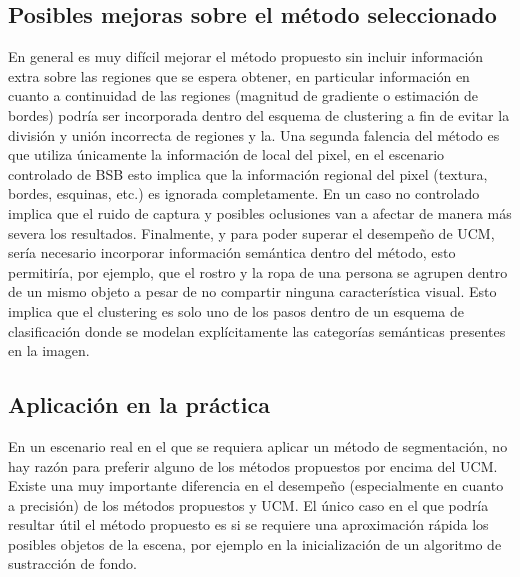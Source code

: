 \documentclass[10pt,twocolumn,letterpaper]{article}
\begin{document}
\subsection{Posibles mejoras sobre el método seleccionado}
En general es muy difícil mejorar el método propuesto sin incluir información extra sobre las regiones que se espera obtener, en particular información en cuanto a continuidad de las regiones (magnitud de gradiente o estimación de bordes) podría ser incorporada dentro del esquema de clustering a fin de evitar la división y unión incorrecta de regiones y la.
Una segunda falencia del método es que utiliza únicamente la información de local del pixel, en el escenario controlado de BSB esto implica que la información regional del pixel (textura, bordes, esquinas, etc.) es ignorada completamente. En un caso no controlado implica que el ruido de captura y posibles oclusiones van a afectar de manera más severa los resultados.
Finalmente, y para poder superar el desempeño de UCM, sería necesario incorporar información semántica dentro del método, esto permitiría, por ejemplo, que  el rostro y la ropa de una persona se agrupen dentro de un mismo objeto a pesar de no compartir ninguna característica visual. Esto implica que el clustering es solo uno de los pasos dentro de un esquema de clasificación donde se modelan explícitamente las categorías semánticas presentes en la imagen.


\subsection{Aplicación en la práctica}
En un escenario real en el que se requiera aplicar un método de segmentación, no hay razón para preferir alguno de los métodos propuestos por encima del UCM. Existe una muy importante diferencia en el desempeño (especialmente en cuanto a precisión) de los métodos propuestos y UCM. El único caso en el que podría resultar útil el método propuesto es si se requiere una aproximación rápida los posibles objetos de la escena, por ejemplo en la inicialización de un algoritmo de sustracción de fondo.


{\small


}
\end{document}
